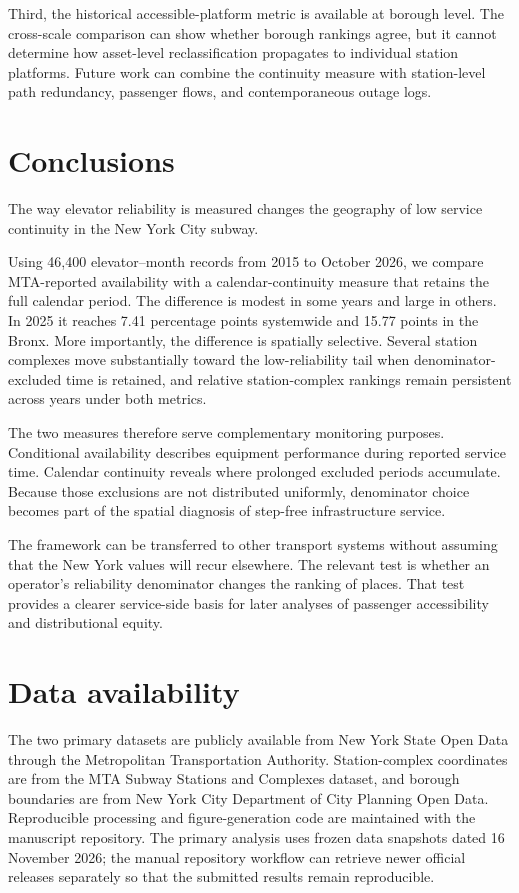 Third, the historical accessible-platform metric is available at borough level. The cross-scale comparison can show whether borough rankings agree, but it cannot determine how asset-level reclassification propagates to individual station platforms. Future work can combine the continuity measure with station-level path redundancy, passenger flows, and contemporaneous outage logs.

\section{Conclusions}

The way elevator reliability is measured changes the geography of low service continuity in the New York City subway.

Using 46,400 elevator--month records from 2015 to October 2026, we compare MTA-reported availability with a calendar-continuity measure that retains the full calendar period. The difference is modest in some years and large in others. In 2025 it reaches 7.41 percentage points systemwide and 15.77 points in the Bronx. More importantly, the difference is spatially selective. Several station complexes move substantially toward the low-reliability tail when denominator-excluded time is retained, and relative station-complex rankings remain persistent across years under both metrics.

The two measures therefore serve complementary monitoring purposes. Conditional availability describes equipment performance during reported service time. Calendar continuity reveals where prolonged excluded periods accumulate. Because those exclusions are not distributed uniformly, denominator choice becomes part of the spatial diagnosis of step-free infrastructure service.

The framework can be transferred to other transport systems without assuming that the New York values will recur elsewhere. The relevant test is whether an operator's reliability denominator changes the ranking of places. That test provides a clearer service-side basis for later analyses of passenger accessibility and distributional equity.

\section*{Data availability}

The two primary datasets are publicly available from New York State Open Data through the Metropolitan Transportation Authority. Station-complex coordinates are from the MTA Subway Stations and Complexes dataset, and borough boundaries are from New York City Department of City Planning Open Data. Reproducible processing and figure-generation code are maintained with the manuscript repository. The primary analysis uses frozen data snapshots dated 16 November 2026; the manual repository workflow can retrieve newer official releases separately so that the submitted results remain reproducible.
